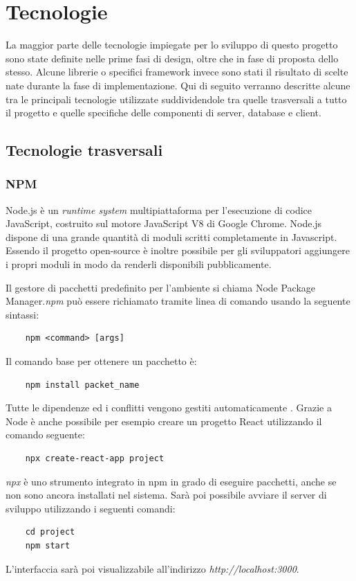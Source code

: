 \chapter{Tecnologie}
La maggior parte delle tecnologie impiegate per lo sviluppo di questo progetto sono state definite nelle prime fasi di design, oltre che in fase di proposta dello stesso. Alcune librerie o specifici framework invece sono stati il risultato di scelte nate durante la fase di implementazione. Qui di seguito verranno descritte alcune tra le principali tecnologie utilizzate suddividendole tra quelle trasversali a tutto il progetto e quelle specifiche delle componenti di server, database e client.

\section{Tecnologie trasversali}

\subsection{NPM}
Node.js \cite{nodejsWikipedia} è un \emph{runtime system} multipiattaforma per l'esecuzione di codice JavaScript, costruito sul motore JavaScript V8 di Google Chrome.
Node.js dispone di una grande quantità di moduli scritti completamente in Javascript.
Essendo il progetto open-source è inoltre possibile per gli sviluppatori aggiungere i propri moduli in modo da renderli disponibili pubblicamente.

Il gestore di pacchetti predefinito per l'ambiente si chiama Node Package Manager.\emph{npm} può essere richiamato tramite linea di comando usando la seguente sintassi:
\begin{verbatim}
    npm <command> [args]
\end{verbatim}
Il comando base per ottenere un pacchetto è:
\begin{verbatim}
    npm install packet_name
\end{verbatim}
Tutte le dipendenze ed i conflitti vengono gestiti automaticamente \cite{npmDoc}. Grazie a Node è anche possibile per esempio creare un progetto React utilizzando il comando seguente:
\begin{verbatim}
    npx create-react-app project
\end{verbatim}
\emph{npx} è uno strumento integrato in npm in grado di eseguire pacchetti, anche se non sono ancora installati nel sistema.
Sarà poi possibile avviare il server di sviluppo utilizzando i seguenti comandi:
\begin{verbatim}
    cd project
    npm start
\end{verbatim}
L'interfaccia sarà poi visualizzabile all'indirizzo \emph{http://localhost:3000}.


